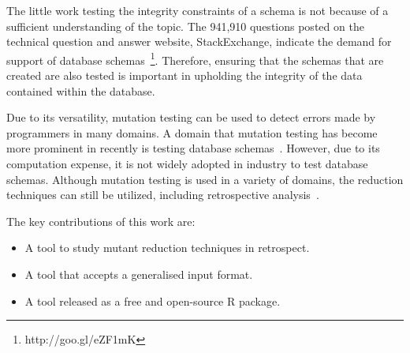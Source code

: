 


The little work testing the integrity constraints of a schema is not because of a sufficient understanding of the topic.
The 941,910 questions posted on the technical question and answer website, StackExchange, indicate the demand for
support of database schemas~\footnote{http://goo.gl/eZF1mK}. Therefore, ensuring that the schemas that are created are
also tested is important in upholding the integrity of the data contained within the database.

Due to its versatility, mutation testing can be used to detect errors made by programmers in many domains.  A domain
that mutation testing has become more prominent in recently is testing database schemas~\cite{mcminn2016virtual,
mcminn2015effectiveness, wright2013efficient}. However, due to its computation expense, it is not widely adopted in
industry to test database schemas.  Although mutation testing is used in a variety of domains, the reduction techniques
can still be utilized, including retrospective analysis~\cite{jia2011analysis, wong1995reducing, offutt1993experimental,
offutt2001mutation}.

The key contributions of this work are:

    \begin{itemize}
        \item A tool to study mutant reduction techniques in retrospect.
        \item A tool that accepts a generalised input format.
        \item A tool released as a free and open-source R package.
    \end{itemize}
